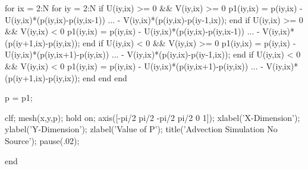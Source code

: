 \documentclass[12pt]{article}
\begin{document}
\begin{verbatimtab}
    for ix = 2:N
        for iy = 2:N
            if U(iy,ix) >= 0 && V(iy,ix) >= 0
                p1(iy,ix) = p(iy,ix) - U(iy,ix)*(p(iy,ix)-p(iy,ix-1)) ...
                           - V(iy,ix)*(p(iy,ix)-p(iy-1,ix));
            end
            if U(iy,ix) >= 0 && V(iy,ix) < 0
                p1(iy,ix) = p(iy,ix) - U(iy,ix)*(p(iy,ix)-p(iy,ix-1)) ...
                           - V(iy,ix)*(p(iy+1,ix)-p(iy,ix));
            end
            if U(iy,ix) < 0 && V(iy,ix) >= 0
                p1(iy,ix) = p(iy,ix) - U(iy,ix)*(p(iy,ix+1)-p(iy,ix)) ...
                           - V(iy,ix)*(p(iy,ix)-p(iy-1,ix));
            end
            if U(iy,ix) < 0 && V(iy,ix) < 0
                p1(iy,ix) = p(iy,ix) - U(iy,ix)*(p(iy,ix+1)-p(iy,ix)) ...
                           - V(iy,ix)*(p(iy+1,ix)-p(iy,ix));
            end
        end
    end
    
    p = p1;
    
    clf;
    mesh(x,y,p); hold on;
    axis([-pi/2 pi/2 -pi/2 pi/2 0 1]);
    xlabel('X-Dimension');
    ylabel('Y-Dimension');
    zlabel('Value of P');
    title('Advection Simulation No Source');
    pause(.02);
    
end

\end{verbatimtab}

\setcounter{page}{1} \pagestyle{empty}


\end{document}
